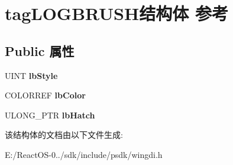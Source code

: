 \hypertarget{structtag_l_o_g_b_r_u_s_h}{}\section{tag\+L\+O\+G\+B\+R\+U\+S\+H结构体 参考}
\label{structtag_l_o_g_b_r_u_s_h}
\subsection*{Public 属性}
\begin{DoxyCompactItemize}
\item 
\mbox{\label{structtag_l_o_g_b_r_u_s_h_a54844a70054abc1ba7ba5326f24abb42}} 
U\+I\+NT {\bfseries lb\+Style}
\item 
\mbox{\label{structtag_l_o_g_b_r_u_s_h_aa00f174aab7db046c0827f7ba33812dd}} 
C\+O\+L\+O\+R\+R\+EF {\bfseries lb\+Color}
\item 
\mbox{\label{structtag_l_o_g_b_r_u_s_h_a93540c6ad88e534e3eb76b23b4a51a95}} 
U\+L\+O\+N\+G\+\_\+\+P\+TR {\bfseries lb\+Hatch}
\end{DoxyCompactItemize}


该结构体的文档由以下文件生成\+:\begin{DoxyCompactItemize}
\item 
E\+:/\+React\+O\+S-\/0../sdk/include/psdk/wingdi.\+h\end{DoxyCompactItemize}
